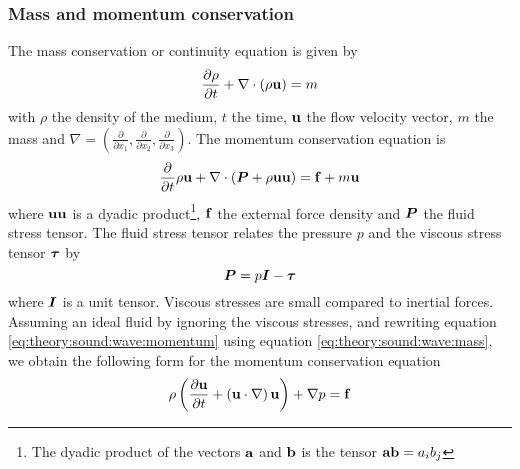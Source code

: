 \subsubsection*{Mass and momentum conservation}
The mass conservation or continuity equation is given by
\begin{equation}\label{eq:theory:sound:wave:mass}
 \frac{\partial \rho}{\partial t} + \nabla \cdot \left( \rho \mathbf{u} \right) = m
\end{equation}
with $\rho$ the density of the medium, $t$ the time, $\mathbf{u}$ the flow velocity
vector, $m$ the mass and $\nabla = \left( \frac{\partial}{\partial
x_1},\frac{\partial}{\partial x_2},\frac{\partial}{\partial x_3} \right)$.
The momentum conservation equation is
\begin{equation}\label{eq:theory:sound:wave:momentum}
 \frac{\partial}{\partial t} \rho \mathbf{u} + \nabla \cdot \left(\bm{P} + \rho \mathbf{u} \mathbf{u}  \right) = \mathbf{f} + m \mathbf{u}
\end{equation}
where $\mathbf{u} \mathbf{u}$ is a dyadic product\footnote{The dyadic product of the
vectors $\mathbf{a}$ and $\mathbf{b}$ is the tensor $\mathbf{a}\mathbf{b}=a_i b_j$},
$\mathbf{f}$ the external force density and $\bm{P}$ the fluid stress tensor.
The fluid stress tensor relates the pressure $p$ and the viscous stress tensor
$\bm{\tau}$ by
\begin{equation}
  \bm{P} = p \bm{I} - \bm{\tau}
\end{equation}
where $\bm{I}$ is a unit tensor. Viscous stresses are small compared to inertial
forces. Assuming an ideal fluid by ignoring the viscous stresses, and rewriting equation
\ref{eq:theory:sound:wave:momentum} using equation
\ref{eq:theory:sound:wave:mass}, we obtain the following form for the momentum conservation equation
\begin{equation}
 \rho \left( \frac{\partial \mathbf{u}}{\partial t} + \left( \mathbf{u} \cdot \nabla \right) \mathbf{u} \right) + \nabla p = \mathbf{f}
\end{equation}

